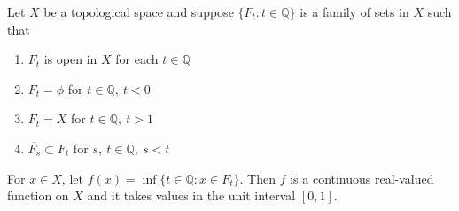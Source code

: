\begin{lemma}
	Let \( X \) be a topological space and suppose \( \{ F_t : t \in \mathbb{Q} \} \) is a family of sets in \( X \) such that 
	\begin{enumerate}
		\item \( F_t \) is open in \( X \) for each \( t \in \mathbb{Q} \)
		\item \( F_t = \phi \) for \( t \in \mathbb{Q},\ t < 0 \)
		\item \( F_t = X \) for \( t \in \mathbb{Q},\ t > 1 \)
		\item \( \overline{F_s} \subset F_t \) for \( s,\ t \in \mathbb{Q},\ s < t \)
	\end{enumerate}
	For \( x \in X \), let \( f(x) = \inf \{ t \in \mathbb{Q} : x \in F_t \} \).
	Then \( f \) is a continuous real-valued function on \( X \) and it takes values in the unit interval \( [0,1] \).
\end{lemma}
